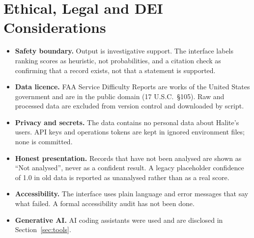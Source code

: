 \section{Ethical, Legal and DEI Considerations}
\begin{itemize}
\item \textbf{Safety boundary.} Output is investigative support. The interface labels ranking scores as heuristic, not probabilities, and a citation check as confirming that a record exists, not that a statement is supported.
\item \textbf{Data licence.} FAA Service Difficulty Reports are works of the United States government and are in the public domain (17 U.S.C.~\S105). Raw and processed data are excluded from version control and downloaded by script.
\item \textbf{Privacy and secrets.} The data contains no personal data about Halite's users. API keys and operations tokens are kept in ignored environment files; none is committed.
\item \textbf{Honest presentation.} Records that have not been analysed are shown as ``Not analysed'', never as a confident result. A legacy placeholder confidence of 1.0 in old data is reported as unanalysed rather than as a real score.
\item \textbf{Accessibility.} The interface uses plain language and error messages that say what failed. A formal accessibility audit has not been done.
\item \textbf{Generative AI.} AI coding assistants were used and are disclosed in Section~\ref{sec:tools}.
\end{itemize}
